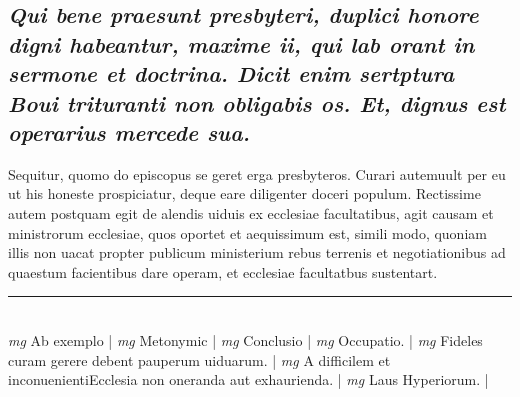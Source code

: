 \documentclass{article}
\begin{document}
\begin{pages}
\subsection*{\textit{Qui bene praesunt presbyteri, duplici honore digni habeantur, maxime ii, qui lab orant in sermone et doctrina. Dicit enim sertptura Boui trituranti non obligabis os. Et, dignus est operarius mercede sua. }}\pstart Sequitur, quomo do episcopus se geret erga presbyteros. Curari autemuult per eu ut his honeste prospiciatur, deque eare diligenter doceri populum. Rectissime autem postquam egit de alendis uiduis ex ecclesiae facultatibus, agit causam et ministrorum ecclesiae, quos oportet et aequissimum est, simili modo, quoniam illis non uacat propter publicum ministerium rebus terrenis et negotiationibus ad quaestum facientibus dare operam, et ecclesiae facultatbus sustentart.  \pend
\vspace{0.5cm}\noindent
\vspace{0.2cm}\rule{1cm}{0.2pt}\\ 
\hspace{0.2cm}\textit{mg}
\footnotesize Ab exemplo 
\normalsize| 
\hspace{0.2cm}\textit{mg}
\footnotesize Metonymic 
\normalsize| 
\hspace{0.2cm}\textit{mg}
\footnotesize Conclusio 
\normalsize| 
\hspace{0.2cm}\textit{mg}
\footnotesize Occupatio. 
\normalsize| 
\hspace{0.2cm}\textit{mg}
\footnotesize Fideles curam gerere debent pauperum uiduarum. 
\normalsize| 
\hspace{0.2cm}\textit{mg}
\footnotesize A difficilem et inconuenientiEcclesia non oneranda aut exhaurienda. 
\normalsize| 
\hspace{0.2cm}\textit{mg}
\footnotesize Laus Hyperiorum. 
\normalsize| 

\end{pages}
\end{document}
